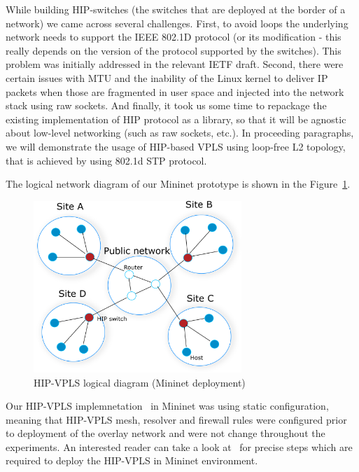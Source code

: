 While building HIP-switches (the switches that are deployed at the border of a network) 
we came across several challenges. First, to avoid loops the underlying network needs to support 
the IEEE 802.1D protocol (or its modification - this really depends on the version of the protocol 
supported by the switches). This problem was initially addressed in the relevant IETF draft. 
Second, there were certain issues with MTU and the inability of the Linux kernel to deliver IP 
packets when those are fragmented in user space and injected into the network stack using raw 
sockets. And finally, it took us some time to repackage the existing implementation of HIP protocol 
as a library, so that it will be agnostic about low-level networking (such as raw sockets, etc.). 
In proceeding paragraphs, we will demonstrate the usage of HIP-based VPLS using loop-free L2 topology,
that is achieved by using 802.1d STP protocol.

The logical network diagram of our Mininet prototype is shown in the Figure~\ref{fig:mininet}.

\begin{figure}[h!]
    \centering
    \includegraphics[width=0.7\textwidth]{graphics/mininet.png}
    \caption{HIP-VPLS logical diagram (Mininet deployment)}
    \label{fig:mininet}
\end{figure}

Our HIP-VPLS implemnetation~\cite{hip-vpls:mininet} in Mininet was using static configuration, meaning that 
HIP-VPLS mesh, resolver and firewall rules were configured prior to deployment 
of the overlay network and were not change throughout the experiments. An interested reader
can take a look at~\cite{hip-vpls:mininet} for precise steps which are required to 
deploy the HIP-VPLS in Mininet environment.

